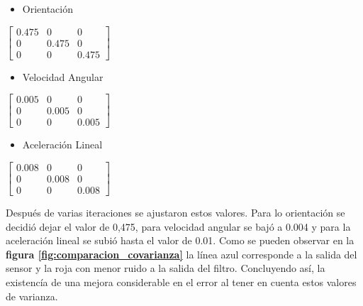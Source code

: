 \begin{minipage}[b]{0.3\textwidth}
    \centering

\begin{itemize}
  \item Orientación
\end{itemize}
$\begin{bmatrix}
  0.475 & 0 & 0\\
  0 & 0.475 & 0\\
  0 & 0 & 0.475
\end{bmatrix}$
\end{minipage}
\hfill
\begin{minipage}[b]{0.3\textwidth}
    \centering

\begin{itemize}
  \item Velocidad Angular
\end{itemize}
$\begin{bmatrix}
  0.005 & 0 & 0\\
  0 & 0.005 & 0\\
  0 & 0 & 0.005
\end{bmatrix}$
\end{minipage}
\hfill
\begin{minipage}[b]{0.3\textwidth}
    \centering


\begin{itemize}
  \item Aceleración Lineal
\end{itemize}

$\begin{bmatrix}
  0.008 & 0 & 0\\
  0 & 0.008 & 0\\
  0 & 0 & 0.008
\end{bmatrix}$

\end{minipage}


Después de varias iteraciones se ajustaron estos valores. Para lo orientación se decidió dejar el valor de 0,475, para velocidad angular se bajó a 0.004 y para la aceleración lineal se subió hasta 
el valor de 0.01. Como se pueden observar en la \textbf{figura \ref{fig:comparacion_covarianza}} la línea azul corresponde a la salida del sensor y 
la roja con menor ruido a la salida del filtro. Concluyendo así, la existencía de una mejora considerable en el error al tener en cuenta estos valores de varianza.



